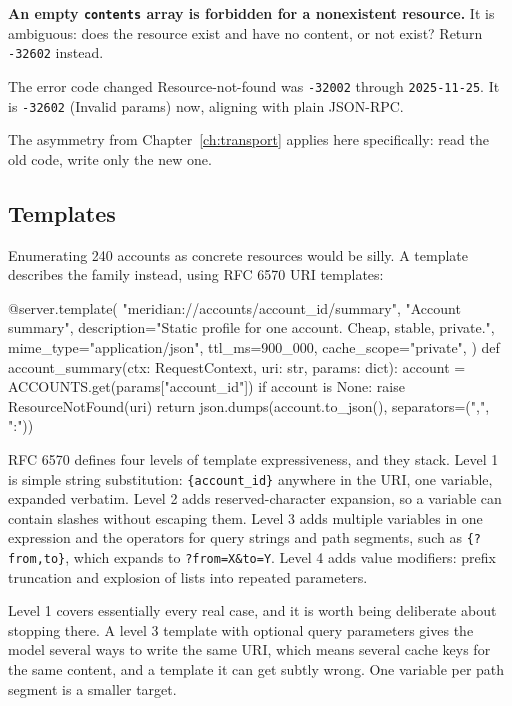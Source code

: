 \textbf{An empty \texttt{contents} array is forbidden for a nonexistent
resource.} It is ambiguous: does the resource exist and have no content, or not
exist? Return \texttt{-32602} instead.

\begin{legacybox}{The error code changed}
Resource-not-found was \texttt{-32002} through \texttt{2025-11-25}. It is
\texttt{-32602} (Invalid params) now, aligning with plain JSON-RPC.

The asymmetry from Chapter~\ref{ch:transport} applies here specifically: read
the old code, write only the new one.
\end{legacybox}

\subsection{Templates}

Enumerating 240 accounts as concrete resources would be silly. A template
describes the family instead, using RFC 6570 URI templates:

\begin{py}
@server.template(
    "meridian://accounts/{account_id}/summary",
    "Account summary",
    description="Static profile for one account. Cheap, stable, private.",
    mime_type="application/json",
    ttl_ms=900_000,
    cache_scope="private",
)
def account_summary(ctx: RequestContext, uri: str, params: dict):
    account = ACCOUNTS.get(params["account_id"])
    if account is None:
        raise ResourceNotFound(uri)
    return json.dumps(account.to_json(), separators=(",", ":"))
\end{py}

RFC 6570 defines four levels of template expressiveness, and they stack. Level 1
is simple string substitution: \texttt{\{account\_id\}} anywhere in the URI, one
variable, expanded verbatim. Level 2 adds reserved-character expansion, so a
variable can contain slashes without escaping them. Level 3 adds multiple
variables in one expression and the operators for query strings and path
segments, such as \texttt{\{?from,to\}}, which expands to
\texttt{?from=X\&to=Y}. Level 4 adds value modifiers: prefix truncation and
explosion of lists into repeated parameters.

Level 1 covers essentially every real case, and it is worth being deliberate
about stopping there. A level 3 template with optional query parameters gives
the model several ways to write the same URI, which means several cache keys for
the same content, and a template it can get subtly wrong. One variable per path
segment is a smaller target.

